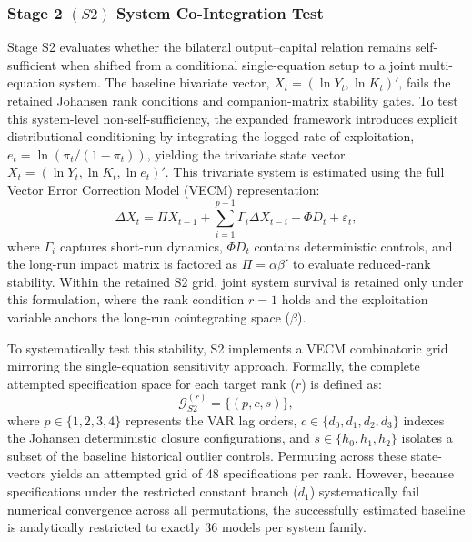 \documentclass[11pt]{article}
\begin{document}
\subsubsection{Stage 2 \texorpdfstring{$(S2)$}: System Co-Integration Test}
\label{subsec:S2_system}

Stage S2 evaluates whether the bilateral output--capital relation remains self-sufficient when shifted from a conditional single-equation setup to a joint multi-equation system. The baseline bivariate vector, $X_t = (\ln Y_t, \ln K_t)'$, fails the retained Johansen rank conditions and companion-matrix stability gates. To test this system-level non-self-sufficiency, the expanded framework introduces explicit distributional conditioning by integrating the logged rate of exploitation, $e_t = \ln(\pi_t / (1 - \pi_t))$, yielding the trivariate state vector $X_t = (\ln Y_t, \ln K_t, \ln e_t)'$. This trivariate system is estimated using the full \citet{Johansen1991} Vector Error Correction Model (VECM) representation:
\begin{equation}
\label{eq:vecm_johansen}
\Delta X_t = \Pi X_{t-1} + \sum_{i=1}^{p-1} \Gamma_i \Delta X_{t-i} + \Phi D_t + \varepsilon_t,
\end{equation}
where $\Gamma_i$ captures short-run dynamics, $\Phi D_t$ contains deterministic controls, and the long-run impact matrix is factored as $\Pi = \alpha \beta'$ to evaluate reduced-rank stability. Within the retained S2 grid, joint system survival is retained only under this formulation, where the rank condition $r=1$ holds and the exploitation variable anchors the long-run cointegrating space ($\beta$).

To systematically test this stability, S2 implements a VECM combinatoric grid mirroring the single-equation sensitivity approach. Formally, the complete attempted specification space for each target rank ($r$) is defined as:
\begin{equation}
\mathcal{G}_{S2}^{(r)} = \{(p, c, s)\},
\label{eq:G_S2}
\end{equation}
where $p \in \{1, 2, 3, 4\}$ represents the VAR lag orders, $c \in \{d_0, d_1, d_2, d_3\}$ indexes the Johansen deterministic closure configurations, and $s \in \{h_0, h_1, h_2\}$ isolates a subset of the baseline historical outlier controls. Permuting across these state-vectors yields an attempted grid of 48 specifications per rank. However, because specifications under the restricted constant branch ($d_1$) systematically fail numerical convergence across all permutations, the successfully estimated baseline is analytically restricted to exactly 36 models per system family.
\end{document}
